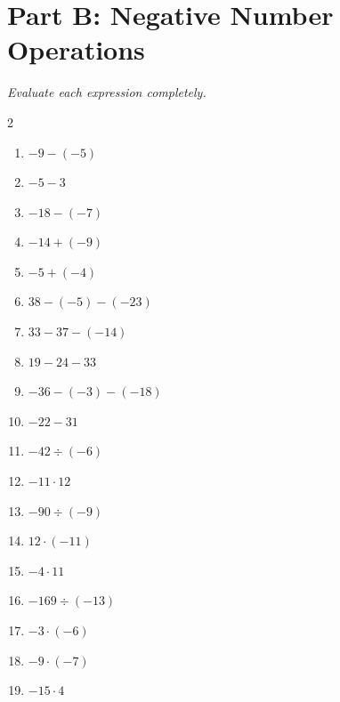 \documentclass[11pt]{article}
\begin{document}
\section*{Part B: Negative Number Operations}
\noindent\textit{Evaluate each expression completely.}
\begin{multicols}{2}
\begin{enumerate}
  \item $-9 - (-5)$
  \vspace{1.1cm}
  \item $-5 - 3$
  \vspace{1.1cm}
  \item $-18 - (-7)$
  \vspace{1.1cm}
  \item $-14 + (-9)$
  \vspace{1.1cm}
  \item $-5 + (-4)$
  \vspace{1.1cm}
  \item $38 - (-5) - (-23)$
  \vspace{1.1cm}
  \item $33 - 37 - (-14)$
  \vspace{1.1cm}
  \item $19 - 24 - 33$
  \vspace{1.1cm}
  \item $-36 - (-3) - (-18)$
  \vspace{1.1cm}
  \item $-22 - 31$
  \vspace{1.1cm}
  \item $-42 \div (-6)$
  \vspace{1.1cm}
  \item $-11 \cdot 12$
  \vspace{1.1cm}
  \item $-90 \div (-9)$
  \vspace{1.1cm}
  \item $12 \cdot (-11)$
  \vspace{1.1cm}
  \item $-4 \cdot 11$
  \vspace{1.1cm}
  \item $-169 \div (-13)$
  \vspace{1.1cm}
  \item $-3 \cdot (-6)$
  \vspace{1.1cm}
  \item $-9 \cdot (-7)$
  \vspace{1.1cm}
  \item $-15 \cdot 4$

\end{enumerate}
\end{multicols}
\end{document}
